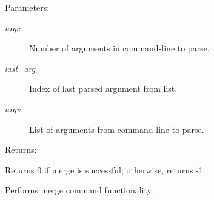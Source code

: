 \begin{Desc}
\item[Parameters: ]\par
\begin{description}
\item[{\em 
argc}]Number of arguments in command-line to parse. \item[{\em 
last\_\-arg}]Index of last parsed argument from list. \item[{\em 
argv}]List of arguments from command-line to parse.\end{description}
\end{Desc}
\begin{Desc}
\item[Returns: ]\par
Returns 0 if merge is successful; otherwise, returns -1.\end{Desc}
Performs merge command functionality. 